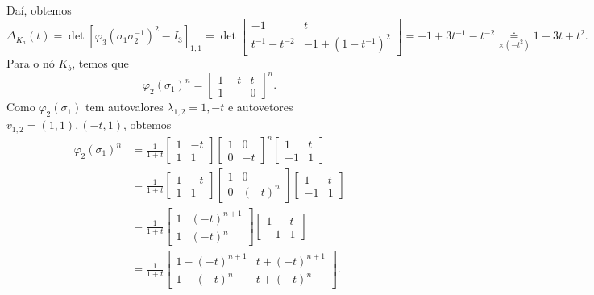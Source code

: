 	Daí, obtemos
	\begin{equation*}
    	\Delta_{K_a}(t) = \det[\varphi_3(\sigma_1\sigma_2^{-1})^2 - I_3]_{1,1} = \det\begin{bmatrix}
    	-1 & t \\
    	t^{-1} - t^{-2} & -1+(1-t^{-1})^2
    	\end{bmatrix} = -1+3t^{-1}-t^{-2} \underset{\times (-t^2)}{\doteq} 1-3t+t^2.
	\end{equation*}
	Para o nó $K_b$, temos que
	\begin{equation*}
    	\varphi_2(\sigma_1)^n = \begin{bmatrix}
    	1-t & t \\
    	1 & 0
    	\end{bmatrix}^n.
	\end{equation*}
	Como $\varphi_2(\sigma_1)$ tem autovalores $\lambda_{1,2} = 1, -t$ e 
	autovetores $v_{1,2} = (1,1), (-t,1)$, obtemos
	\begin{align*}
    	\varphi_2(\sigma_1)^n &= \frac{1}{1+t}\begin{bmatrix}
    	1 & -t \\
    	1 & 1
    	\end{bmatrix}\begin{bmatrix}
    	1 & 0 \\
    	0 & -t
    	\end{bmatrix}^n\begin{bmatrix}
    	1 & t \\
    	-1 & 1
    	\end{bmatrix} \\
    	&= \frac{1}{1+t}\begin{bmatrix}
    	1 & -t \\
    	1 & 1
    	\end{bmatrix}\begin{bmatrix}
    	1 & 0 \\
    	0 & (-t)^n
    	\end{bmatrix}\begin{bmatrix}
    	1 & t \\
    	-1 & 1
    	\end{bmatrix} \\
    	&= \frac{1}{1+t}\begin{bmatrix}
    	1 & (-t)^{n+1} \\
    	1 & (-t)^n
    	\end{bmatrix}\begin{bmatrix}
    	1 & t \\
    	-1 & 1
    	\end{bmatrix} \\
    	&= \frac{1}{1+t}\begin{bmatrix}
    	1 - (-t)^{n+1} & t + (-t)^{n+1} \\
    	1 - (-t)^n & t + (-t)^n
    	\end{bmatrix}.
	\end{align*}
